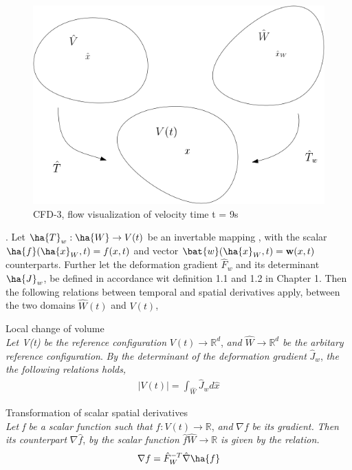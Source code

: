 \begin{figure}[h!]
  \centering
    \includegraphics[scale=0.5]{./Fig/wdom.png}
      \caption{CFD-3, flow visualization of velocity time t = 9s}
\end{figure}


. Let $\ha{T}_w : \ha{W} \rightarrow V(t)$ be an  invertable mapping , with the scalar $\ha{f}(\ha{x}_W, t) = f(x,t) $ and vector $\bat{w}(\ha{x}_W, t) = \mathbf{w}(x,t) $ counterparts. Further let the deformation gradient $\hat{F}_w$ and its determinant $\ha{J}_w$, be defined in accordance wit definition 1.1 and 1.2 in Chapter 1. Then the following relations between temporal and spatial derivatives apply, between the two domains $\hat{W} (t)$ and $V (t)$,



\begin{lem}
Local change of volume \\
\textit{Let V(t) be the reference configuration} $V(t) \rightarrow \mathbb{R}^d$, \textit{and} $\hat{W}  \rightarrow \mathbb{R}^d$ \textit{be the arbitary reference configuration}. \textit{By the determinant of the deformation gradient} $\hat{J}_w$, \textit{the the following relations holds,}
\begin{align}
|V(t)| = \int_{\hat{W}} \hat{J}_w d \hat{x}
\end{align} 
\end{lem}

\begin{lem}
Transformation of scalar spatial derivatives \\
\textit{Let f be a scalar function such that} $f: V(t) \rightarrow \mathbb{R}$, \textit{and} $\nabla f$ \textit{be its gradient.}
\textit{Then its counterpart} $\nabla \hat{f}$, \textit{by the scalar function}  $\hat{f} \hat{W} \rightarrow \mathbb{R}$ \textit{is given by the relation.} 
\begin{align}
\nabla f = \hat{F}_W^{-T} \hat{\nabla}\ha{f}
\end{align} 
\end{lem}

